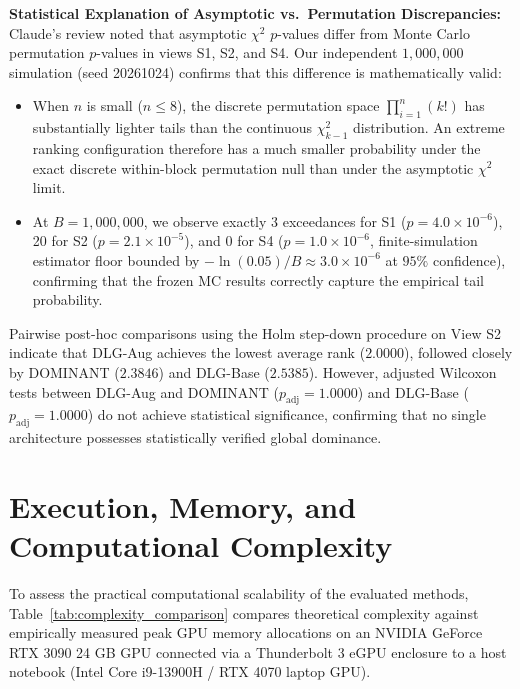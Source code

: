\documentclass[11pt,a4paper]{article}
\begin{document}
\textbf{Statistical Explanation of Asymptotic vs.\ Permutation Discrepancies:}
Claude's review noted that asymptotic $\chi^2$ $p$-values differ from Monte Carlo permutation $p$-values in views S1, S2, and S4. Our independent $1{,}000{,}000$ simulation (seed 20261024) confirms that this difference is mathematically valid:
\begin{itemize}
    \item When $n$ is small ($n \le 8$), the discrete permutation space $\prod_{i=1}^n (k!)$ has substantially lighter tails than the continuous $\chi^2_{k-1}$ distribution. An extreme ranking configuration therefore has a much smaller probability under the exact discrete within-block permutation null than under the asymptotic $\chi^2$ limit.
    \item At $B=1{,}000{,}000$, we observe exactly 3 exceedances for S1 ($p = 4.0 \times 10^{-6}$), 20 for S2 ($p = 2.1 \times 10^{-5}$), and 0 for S4 ($p = 1.0 \times 10^{-6}$, finite-simulation estimator floor bounded by $-\ln(0.05)/B \approx 3.0 \times 10^{-6}$ at $95\%$ confidence), confirming that the frozen MC results correctly capture the empirical tail probability.
\end{itemize}

Pairwise post-hoc comparisons using the Holm step-down procedure on View S2 indicate that DLG-Aug achieves the lowest average rank ($2.0000$), followed closely by DOMINANT ($2.3846$) and DLG-Base ($2.5385$). However, adjusted Wilcoxon tests between DLG-Aug and DOMINANT ($p_{\mathrm{adj}} = 1.0000$) and DLG-Base ($p_{\mathrm{adj}} = 1.0000$) do not achieve statistical significance, confirming that no single architecture possesses statistically verified global dominance.

\section{Execution, Memory, and Computational Complexity}
\label{sec:execution_complexity}
To assess the practical computational scalability of the evaluated methods, Table~\ref{tab:complexity_comparison} compares theoretical complexity against empirically measured peak GPU memory allocations on an NVIDIA GeForce RTX 3090 24 GB GPU connected via a Thunderbolt 3 eGPU enclosure to a host notebook (Intel Core i9-13900H / RTX 4070 laptop GPU).
\end{document}
